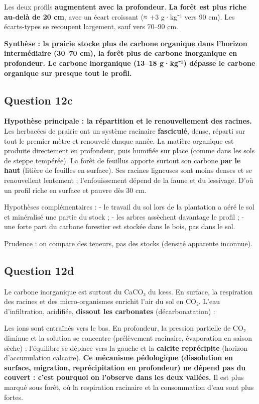 \documentclass[11pt,a4paper]{article}
\newcommand{\equationajustee}[1]{%
  \sbox{\boiteequation}{$\displaystyle #1$}%
  \ifdim\wd\boiteequation>\linewidth
    \[\resizebox{\linewidth}{!}{\usebox{\boiteequation}}\]%
  \else
    \[#1\]%
  \fi}
\begin{document}
Les deux profils \textbf{augmentent avec la profondeur}. \textbf{La forêt est plus riche au-delà de 20 cm}, avec un écart croissant (≈ +3 g·kg⁻¹ vers 90 cm). Les écarts-types se recoupent largement, sauf vers 70--90 cm.

\textbf{Synthèse : la prairie stocke plus de carbone organique dans l'horizon intermédiaire (30--70 cm), la forêt plus de carbone inorganique en profondeur. Le carbone inorganique (13--18 g·kg⁻¹) dépasse le carbone organique sur presque tout le profil.}

\hypertarget{question-12c}{%
\subsection{Question 12c}\label{question-12c}}

\textbf{Hypothèse principale : la répartition et le renouvellement des racines.} Les herbacées de prairie ont un système racinaire \textbf{fasciculé}, dense, réparti sur tout le premier mètre et renouvelé chaque année. La matière organique est produite directement en profondeur, puis humifiée sur place (comme dans les sols de steppe tempérée). La forêt de feuillus apporte surtout son carbone \textbf{par le haut} (litière de feuilles en surface). Ses racines ligneuses sont moins denses et se renouvellent lentement ; l'enfouissement dépend de la faune et du lessivage. D'où un profil riche en surface et pauvre dès 30 cm.

Hypothèses complémentaires :
- le travail du sol lors de la plantation a aéré le sol et minéralisé une partie du stock ;
- les arbres assèchent davantage le profil ;
- une forte part du carbone forestier est stockée dans le bois, pas dans le sol.

Prudence : on compare des teneurs, pas des stocks (densité apparente inconnue).

\hypertarget{question-12d}{%
\subsection{Question 12d}\label{question-12d}}

Le carbone inorganique est surtout du CaCO₃ du lœss. En surface, la respiration des racines et des micro-organismes enrichit l'air du sol en CO₂. L'eau d'infiltration, acidifiée, \textbf{dissout les carbonates} (décarbonatation) :

\equationajustee{\mathrm{CaCO_3+CO_2+H_2O\rightleftharpoons Ca^{2+}+2\,HCO_3^-}}

Les ions sont entraînés vers le bas. En profondeur, la pression partielle de CO₂ diminue et la solution se concentre (prélèvement racinaire, évaporation en saison sèche) : l'équilibre se déplace vers la gauche et la \textbf{calcite reprécipite} (horizon d'accumulation calcaire). \textbf{Ce mécanisme pédologique (dissolution en surface, migration, reprécipitation en profondeur) ne dépend pas du couvert : c'est pourquoi on l'observe dans les deux vallées.} Il est plus marqué sous forêt, où la respiration racinaire et la consommation d'eau sont plus fortes.
\end{document}
